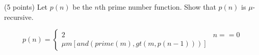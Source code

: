 \documentclass[paper=a4, fontsize=11pt]{scrartcl} %
\begin{document}

\section{}

\begin{fancyquotes}
  (5 points) Let $p(n)$ be the $n$th prime number function.
  Show that $p(n)$ is $\mu$-recursive.
\end{fancyquotes}

\begin{equation}
  p(n) =
  \begin{cases}
    2 & n==0\\
    \mu m[and(\mathit{prime}(m), \mathit{gt}(m,p(n-1)))]
  \end{cases}
\end{equation}

\pagebreak
\end{document}
